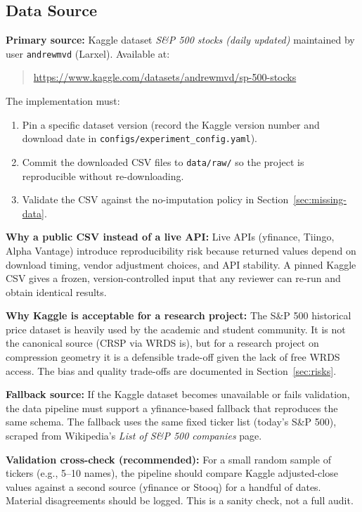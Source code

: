 \documentclass[11pt]{article}
\begin{document}
\subsection{Data Source}\label{sec:data-source}

\textbf{Primary source:} Kaggle dataset \emph{S\&P 500 stocks (daily updated)} maintained by user \texttt{andrewmvd} (Larxel). Available at:
\begin{quote}
\url{https://www.kaggle.com/datasets/andrewmvd/sp-500-stocks}
\end{quote}

The implementation must:

\begin{enumerate}
    \item Pin a specific dataset version (record the Kaggle version number and download date in \texttt{configs/experiment\_config.yaml}).
    \item Commit the downloaded CSV files to \texttt{data/raw/} so the project is reproducible without re-downloading.
    \item Validate the CSV against the no-imputation policy in Section~\ref{sec:missing-data}.
\end{enumerate}

\textbf{Why a public CSV instead of a live API:} Live APIs (yfinance, Tiingo, Alpha Vantage) introduce reproducibility risk because returned values depend on download timing, vendor adjustment choices, and API stability. A pinned Kaggle CSV gives a frozen, version-controlled input that any reviewer can re-run and obtain identical results.

\textbf{Why Kaggle is acceptable for a research project:} The S\&P 500 historical price dataset is heavily used by the academic and student community. It is not the canonical source (CRSP via WRDS is), but for a research project on compression geometry it is a defensible trade-off given the lack of free WRDS access. The bias and quality trade-offs are documented in Section~\ref{sec:risks}.

\textbf{Fallback source:} If the Kaggle dataset becomes unavailable or fails validation, the data pipeline must support a yfinance-based fallback that reproduces the same schema. The fallback uses the same fixed ticker list (today's S\&P 500), scraped from Wikipedia's \emph{List of S\&P 500 companies} page.

\textbf{Validation cross-check (recommended):} For a small random sample of tickers (e.g., 5--10 names), the pipeline should compare Kaggle adjusted-close values against a second source (yfinance or Stooq) for a handful of dates. Material disagreements should be logged. This is a sanity check, not a full audit.
\end{document}
